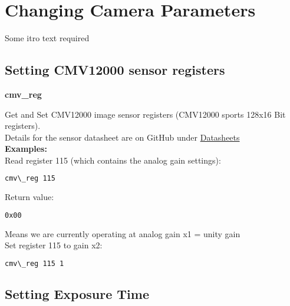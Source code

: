 \section{Changing Camera Parameters}

Some itro text required\\

\subsection{Setting CMV12000 sensor registers}

\textbf{cmv\_reg}

Get and Set CMV12000 image sensor registers (CMV12000 sports 128x16 Bit registers).\\

Details for the sensor datasheet are on GitHub under \href{https://github.com/apertus-open-source-cinema/beta-hardware/tree/master/Datasheets}{Datasheets}\\

\textbf{Examples:}\\

Read register 115 (which contains the analog gain settings): 

\begin{lstlisting}[language=bash,morekeywords=$,keywordstyle=\bfseries,frame=none,xleftmargin=.25in,belowskip=2em, aboveskip=2em]
cmv\_reg 115
\end{lstlisting} 

Return value:

\begin{lstlisting}[language=bash,morekeywords=$,keywordstyle=\bfseries,frame=none,xleftmargin=.25in,belowskip=2em, aboveskip=2em]
0x00
\end{lstlisting} 

Means we are currently operating at analog gain x1 = unity gain\\


Set register 115 to gain x2: 

\begin{lstlisting}[language=bash,morekeywords=$,keywordstyle=\bfseries,frame=none,xleftmargin=.25in,belowskip=2em, aboveskip=2em]
cmv\_reg 115 1
\end{lstlisting}



\subsection{Setting Exposure Time}

